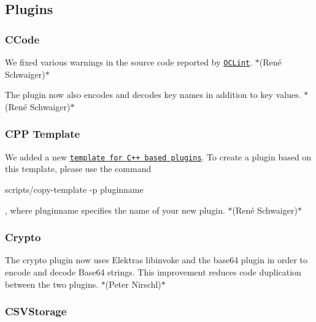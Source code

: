\subsection*{Plugins}

\subsubsection*{C\+Code}


\begin{DoxyItemize}
\item We fixed various warnings in the source code reported by \href{http://oclint.org}{\tt O\+C\+Lint}. $\ast$(René Schwaiger)$\ast$
\item The plugin now also encodes and decodes key names in addition to key values. $\ast$(René Schwaiger)$\ast$
\end{DoxyItemize}

\subsubsection*{C\+PP Template}


\begin{DoxyItemize}
\item We added a new \href{https://www.libelektra.org/plugins/cpptemplate}{\tt template for C++ based plugins}. To create a plugin based on this template, please use the command
\end{DoxyItemize}


\begin{DoxyCode}
scripts/copy-template -p pluginname
\end{DoxyCode}


, where {\ttfamily pluginname} specifies the name of your new plugin. $\ast$(René Schwaiger)$\ast$

\subsubsection*{Crypto}


\begin{DoxyItemize}
\item The {\ttfamily crypto} plugin now uses Elektra\textquotesingle{}s {\ttfamily libinvoke} and the {\ttfamily base64} plugin in order to encode and decode Base64 strings. This improvement reduces code duplication between the two plugins. $\ast$(Peter Nirschl)$\ast$
\end{DoxyItemize}

\subsubsection*{C\+S\+V\+Storage}


